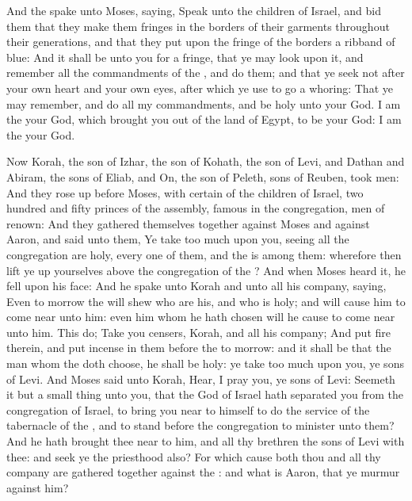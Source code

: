 \begin{biblechapter}
 And the \LORD spake unto Moses, saying,
\verse Speak unto the children of Israel, and bid them that they make them fringes in the borders of their garments throughout their generations, and that they put upon the fringe of the borders a ribband of blue:
\verse And it shall be unto you for a fringe, that ye may look upon it, and remember all the commandments of the \LORD, and do them; and that ye seek not after your own heart and your own eyes, after which ye use to go a whoring:
\verse That ye may remember, and do all my commandments, and be holy unto your God.
\verse I am the \LORD your God, which brought you out of the land of Egypt, to be your God: I am the \LORD your God.
\end{biblechapter}

\begin{biblechapter} %
 Now Korah, the son of Izhar, the son of Kohath, the son of Levi, and Dathan and Abiram, the sons of Eliab, and On, the son of Peleth, sons of Reuben, took men:
\verse And they rose up before Moses, with certain of the children of Israel, two hundred and fifty princes of the assembly, famous in the congregation, men of renown:
\verse And they gathered themselves together against Moses and against Aaron, and said unto them, Ye take too much upon you, seeing all the congregation are holy, every one of them, and the \LORD is among them: wherefore then lift ye up yourselves above the congregation of the \LORD?
\verse And when Moses heard it, he fell upon his face:
\verse And he spake unto Korah and unto all his company, saying, Even to morrow the \LORD will shew who are his, and who is holy; and will cause him to come near unto him: even him whom he hath chosen will he cause to come near unto him.
\verse This do; Take you censers, Korah, and all his company;
\verse And put fire therein, and put incense in them before the \LORD to morrow: and it shall be that the man whom the \LORD doth choose, he shall be holy: ye take too much upon you, ye sons of Levi.
\verse And Moses said unto Korah, Hear, I pray you, ye sons of Levi:
\verse Seemeth it but a small thing unto you, that the God of Israel hath separated you from the congregation of Israel, to bring you near to himself to do the service of the tabernacle of the \LORD, and to stand before the congregation to minister unto them?
\verse And he hath brought thee near to him, and all thy brethren the sons of Levi with thee: and seek ye the priesthood also?
\verse For which cause both thou and all thy company are gathered together against the \LORD: and what is Aaron, that ye murmur against him?

\end{biblechapter}
